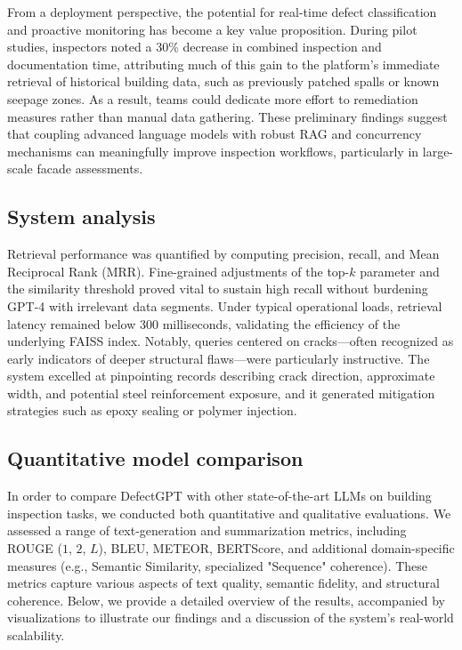 \documentclass[a4paper,fleqn]{cas-sc}
\begin{document}
From a deployment perspective, the potential for real-time defect classification and proactive monitoring has become a key value proposition. During pilot studies, inspectors noted a 30\% decrease in combined inspection and documentation time, attributing much of this gain to the platform's immediate retrieval of historical building data, such as previously patched spalls or known seepage zones. As a result, teams could dedicate more effort to remediation measures rather than manual data gathering. These preliminary findings suggest that coupling advanced language models with robust RAG and concurrency mechanisms can meaningfully improve inspection workflows, particularly in large-scale facade assessments.

\subsection{System analysis}

Retrieval performance was quantified by computing precision, recall, and Mean Reciprocal Rank (MRR). Fine-grained adjustments of the top-$k$ parameter and the similarity threshold proved vital to sustain high recall without burdening GPT-4 with irrelevant data segments. Under typical operational loads, retrieval latency remained below 300 milliseconds, validating the efficiency of the underlying FAISS index. Notably, queries centered on cracks—often recognized as early indicators of deeper structural flaws—were particularly instructive. The system excelled at pinpointing records describing crack direction, approximate width, and potential steel reinforcement exposure, and it generated mitigation strategies such as epoxy sealing or polymer injection.

\subsection{Quantitative model comparison}
\label{sec:quantitative-comparison}

In order to compare DefectGPT with other state-of-the-art LLMs on building inspection tasks, we conducted both quantitative and qualitative evaluations. We assessed a range of text-generation and summarization metrics, including ROUGE ($1$, $2$, $L$), BLEU, METEOR, BERTScore, and additional domain-specific measures (e.g., Semantic Similarity, specialized "Sequence" coherence). These metrics capture various aspects of text quality, semantic fidelity, and structural coherence. Below, we provide a detailed overview of the results, accompanied by visualizations to illustrate our findings and a discussion of the system's real-world scalability.
\end{document}

